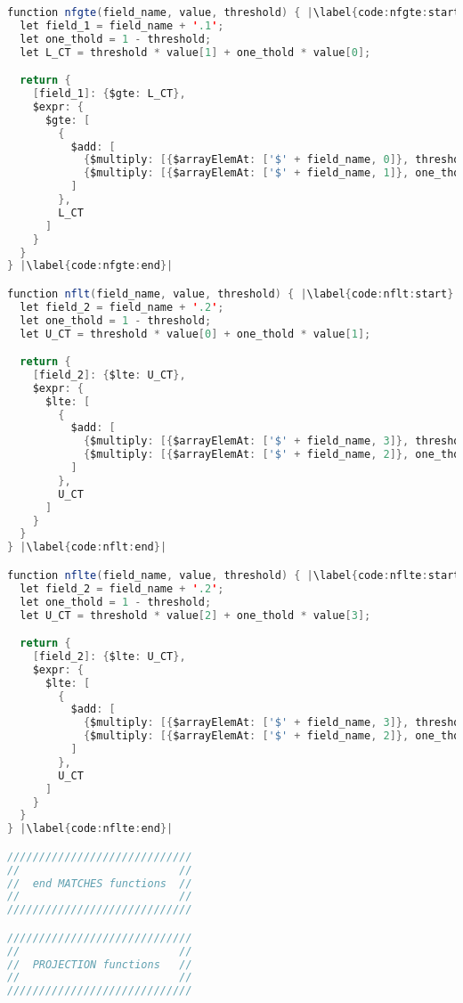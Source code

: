 \begin{lstlisting}[language=java, escapechar=|]
function nfgte(field_name, value, threshold) { |\label{code:nfgte:start}|
  let field_1 = field_name + '.1';
  let one_thold = 1 - threshold;
  let L_CT = threshold * value[1] + one_thold * value[0];

  return {
    [field_1]: {$gte: L_CT},
    $expr: {
      $gte: [
        {
          $add: [
            {$multiply: [{$arrayElemAt: ['$' + field_name, 0]}, threshold]},
            {$multiply: [{$arrayElemAt: ['$' + field_name, 1]}, one_thold]}
          ]
        },
        L_CT
      ]
    }
  }
} |\label{code:nfgte:end}|

function nflt(field_name, value, threshold) { |\label{code:nflt:start}|
  let field_2 = field_name + '.2';
  let one_thold = 1 - threshold;
  let U_CT = threshold * value[0] + one_thold * value[1];

  return {
    [field_2]: {$lte: U_CT},
    $expr: {
      $lte: [
        {
          $add: [
            {$multiply: [{$arrayElemAt: ['$' + field_name, 3]}, threshold]},
            {$multiply: [{$arrayElemAt: ['$' + field_name, 2]}, one_thold]}
          ]
        },
        U_CT
      ]
    }
  }
} |\label{code:nflt:end}|

function nflte(field_name, value, threshold) { |\label{code:nflte:start}|
  let field_2 = field_name + '.2';
  let one_thold = 1 - threshold;
  let U_CT = threshold * value[2] + one_thold * value[3];

  return {
    [field_2]: {$lte: U_CT},
    $expr: {
      $lte: [
        {
          $add: [
            {$multiply: [{$arrayElemAt: ['$' + field_name, 3]}, threshold]},
            {$multiply: [{$arrayElemAt: ['$' + field_name, 2]}, one_thold]}
          ]
        },
        U_CT
      ]
    }
  }
} |\label{code:nflte:end}|

/////////////////////////////
//                         //
//  end MATCHES functions  //
//                         //
/////////////////////////////

/////////////////////////////
//                         //
//  PROJECTION functions   //
//                         //
/////////////////////////////


\end{lstlisting}
